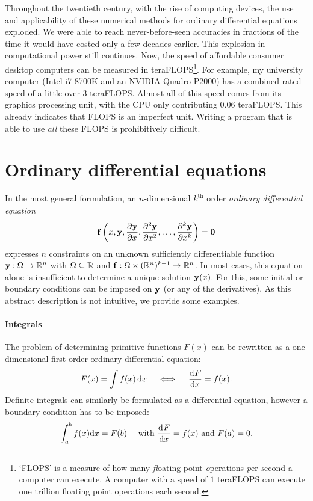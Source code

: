 Throughout the twentieth century, with the rise of computing devices, the use and applicability of these numerical methods for ordinary differential equations exploded. We were able to reach never-before-seen accuracies in fractions of the time it would have costed only a few decades earlier. This explosion in computational power still continues. Now, the speed of affordable consumer desktop computers can be measured in teraFLOPS\footnote{`FLOPS' is a measure of how many \emph{fl}oating point \emph{o}perations \emph{p}er \emph{s}econd a computer can execute. A computer with a speed of $1$ teraFLOPS can execute one trillion floating point operations each second.}. For example, my university computer (Intel i7-8700K and an NVIDIA Quadro P2000) has a combined rated speed of a little over 3 teraFLOPS. Almost all of this speed comes from its graphics processing unit, with the CPU only contributing $0.06$ teraFLOPS. This already indicates that FLOPS is an imperfect unit. Writing a program that is able to use \emph{all} these FLOPS is prohibitively difficult.

\section{Ordinary differential equations}

In the most general formulation, an $n$-dimensional $k^\text{th}$ order \emph{ordinary differential equation}
\begin{equation}\label{equ:c1_ode_def}
    \vb{f}\left(x, \vb{y}, {\pdv[]{\vb{y}}{x}}, {\pdv[2]{\vb{y}}{x}}, \dots, {\pdv[k]{\vb{y}}{x}}\right) = \vb{0}
\end{equation}
expresses $n$ constraints on an unknown sufficiently differentiable function $\vb{y} : \Omega \to \mathbb{R}^n$ with $\Omega \subseteq \mathbb{R}$ and $\vb{f}: \Omega \times (\mathbb{R}^n)^{k+1} \to \mathbb{R}^n$. In most cases, this equation alone is insufficient to determine a unique solution $\vb{y}(x)$. For this, some initial or boundary conditions can be imposed on $\vb{y}$ (or any of the derivatives). As this abstract description is not intuitive, we provide some examples.

\paragraph{Integrals} The problem of determining primitive functions $F(x)$ can be rewritten as a one-dimensional first order ordinary differential equation:
$$
    F(x) = \int f(x) \,\dd x \quad \iff \quad \dv[]{F}{x} = f(x)\text{.}
$$
Definite integrals can similarly be formulated as a differential equation, however a boundary condition has to be imposed:
$$
    \int_a^b f(x) \dd x = F(b) \quad \text{ with } \dv[]{F}{x} = f(x) \text{ and } F(a) = 0\text{.}
$$

